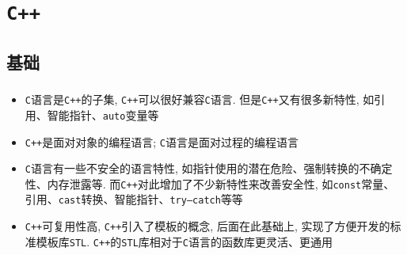 \newpage
\thispagestyle{fancy}
\setcounter{page}{1}
\chapter{\tt C++}
\thispagestyle{fancy}

\section{基础}
\subsection[ISOK:{\tt C}和{\tt C++}区别]{}
\begin{itemize}
	\item {\tt C}语言是{\tt C++}的子集, {\tt C++}可以很好兼容{\tt C}语言. 但是{\tt C++}又有很多新特性, 如引用、智能指针、{\tt auto}变量等
	\item {\tt C++}是面对对象的编程语言; {\tt C}语言是面对过程的编程语言
	\item {\tt C}语言有一些不安全的语言特性, 如指针使用的潜在危险、强制转换的不确定性、内存泄露等. 而{\tt C++}对此增加了不少新特性来改善安全性, 如{\tt const}常量、引用、{\tt cast}转换、智能指针、{\tt try—catch}等等
	\item {\tt C++}可复用性高, {\tt C++}引入了模板的概念, 后面在此基础上, 实现了方便开发的标准模板库{\tt STL}. {\tt C++}的{\tt STL}库相对于{\tt C}语言的函数库更灵活、更通用
\end{itemize}
\subsection[多态的实现原理和应用场景]{\color{purple}{多态的实现原理和应用场景}}
\subsection[线程安全的实现及标准容器库的线程安全性]{\color{purple}{线程安全的实现及标准容器库的线程安全性}}
\subsection[{\tt sort}算法是怎么实现的]{}
\subsection[{\tt malloc}和{\tt new}区别]{}
